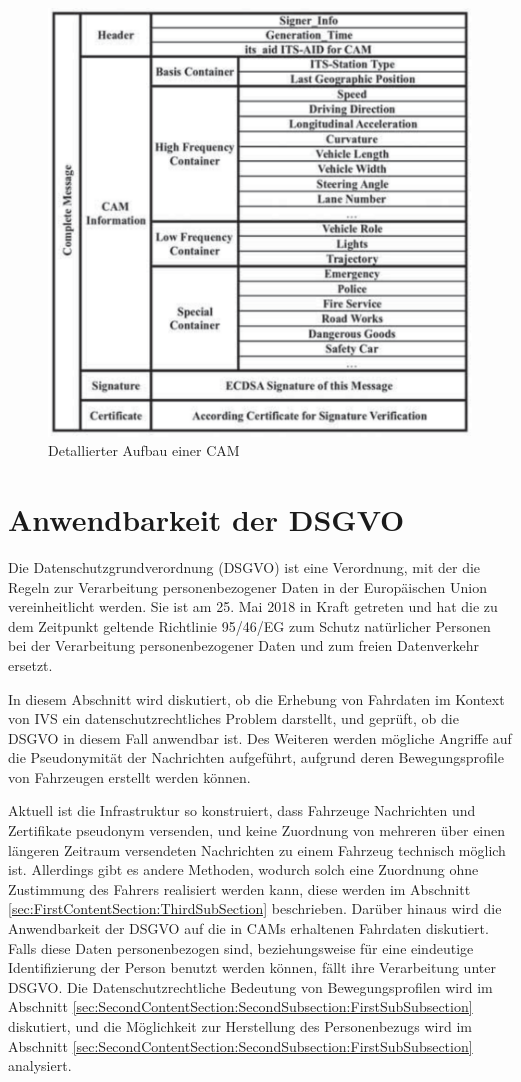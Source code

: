 \begin{figure}
	\centering
	\includegraphics[width=0.4\linewidth]{images/CAM}
	\caption[Detallierter Aufbau einer CAM]{Detallierter Aufbau einer CAM \footnotemark}
	\label{fig:cam}
\end{figure}


\section{Anwendbarkeit der DSGVO}
\label{ch:SecondContentSection}

Die Datenschutzgrundverordnung (DSGVO) ist eine Verordnung, mit der die Regeln zur Verarbeitung personenbezogener Daten in der Europäischen Union vereinheitlicht werden. Sie ist am 25. Mai 2018 in Kraft getreten und hat die zu dem Zeitpunkt geltende Richtlinie 95/46/EG zum Schutz natürlicher Personen bei der Verarbeitung personenbezogener Daten und zum freien Datenverkehr ersetzt. 

In diesem Abschnitt wird diskutiert, ob die Erhebung von Fahrdaten im Kontext von IVS ein datenschutzrechtliches Problem darstellt, und geprüft, ob die DSGVO in diesem Fall anwendbar ist. Des Weiteren werden mögliche Angriffe auf die Pseudonymität der Nachrichten aufgeführt, aufgrund deren Bewegungsprofile von Fahrzeugen erstellt werden können. 

Aktuell ist die Infrastruktur so konstruiert, dass Fahrzeuge Nachrichten und Zertifikate pseudonym versenden, und keine Zuordnung von mehreren über einen längeren Zeitraum versendeten Nachrichten zu einem Fahrzeug technisch möglich ist. Allerdings gibt es andere Methoden, wodurch solch eine Zuordnung ohne Zustimmung des Fahrers realisiert werden kann, diese werden im Abschnitt \ref{sec:FirstContentSection:ThirdSubSection} beschrieben. Darüber hinaus wird die Anwendbarkeit der DSGVO auf die in CAMs erhaltenen Fahrdaten diskutiert. Falls diese Daten personenbezogen sind, beziehungsweise für eine eindeutige Identifizierung der Person benutzt werden können, fällt ihre Verarbeitung unter DSGVO. Die Datenschutzrechtliche Bedeutung von Bewegungsprofilen wird im Abschnitt \ref{sec:SecondContentSection:SecondSubsection:FirstSubSubsection} diskutiert, und die Möglichkeit zur Herstellung des Personenbezugs wird im Abschnitt \ref{sec:SecondContentSection:SecondSubsection:FirstSubSubsection} analysiert.

